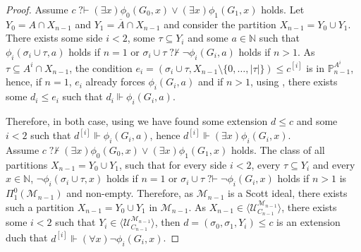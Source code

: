 \documentclass{article}
\def\NN{\mathbb{N}}
\def\PP{\mathbb{P}}
\def\DD{\mathbb{D}}
\def\U{\mathcal{U}}
\def\M{\mathcal{M}}
\def\PP{\mathbb{P}}
\newcommand{\qvdash}{\operatorname{{?}{\vdash}}}
\newcommand{\nqvdash}{\operatorname{{?}{\nvdash}}}
\numberwithin{theorem}{section}
\newtheorem{lemma}[theorem]{Lemma}
\theoremstyle{definition}
\begin{document}
\begin{proof}

Assume $c \qvdash (\exists x)\phi_0(G_0,x) \vee (\exists x)\phi_1(G_1,x)$ holds. Let $Y_0 = A \cap X_{n-1}$ and $Y_1 = \overline{A} \cap X_{n-1}$ and consider the partition $X_{n-1} = Y_0 \cup Y_1$. There exists some side $i < 2$, some $\tau \subseteq Y_i$ and some $a \in \NN$ such that $\phi_i(\sigma_i \cup \tau,a)$ holds if $n = 1$ or $\sigma_i \cup \tau \nqvdash \neg \phi_{i}(G_i,a)$ holds if $n > 1$. As $\tau \subseteq A^i \cap X_{n-1}$, the condition $e_i = (\sigma_i \cup \tau, X_{n-1} \setminus \{0, \dots, |\tau|\}) \leq c^{[i]}$ is in $\PP_{n-1}^{A^i}$, hence, if $n = 1$, $e_i$ already forces $\phi_i(G_i,a)$ and if $n > 1$, using , there exists some $d_i \leq e_i$ such that $d_i \Vdash \phi_{i}(G_i,a)$.

Therefore, in both case, using  we have found some extension $d \leq c$ and some $i < 2$ such that $d^{[i]} \Vdash \phi_{i}(G_i,a)$, hence $d^{[i]} \Vdash (\exists x)\phi_i(G_i,x)$. \\

Assume $c \nqvdash (\exists x)\phi_0(G_0,x) \vee (\exists x)\phi_1(G_1,x)$ holds. The class of all partitions $X_{n-1} = Y_0 \cup Y_1$, such that for every side $i < 2$, every $\tau \subseteq Y_i$ and every $x \in \NN$, $\neg \phi_i(\sigma_i \cup \tau, x)$ holds if $n = 1$ or $\sigma_i \cup \tau \qvdash \neg \phi_{i}(G_i,x)$ holds if $n > 1$ is $\Pi_1^0(\M_{n-1})$ and non-empty. Therefore, as $\M_{n-1}$ is a Scott ideal, there exists such a partition $X_{n-1} = Y_0 \cup Y_1$ in $\M_{n-1}$. As $X_{n-1} \in \langle \U_{C_{n-1}}^{\M_{n-1}} \rangle$, there exists some $i < 2$ such that $Y_i \in \langle \U_{C_{n-1}}^{\M_{n-1}} \rangle$, then $d = (\sigma_0, \sigma_1, Y_i) \leq c$ is an extension duch that $d^{[i]} \Vdash (\forall x) \neg \phi_i(G_i,x)$.
\end{proof}
\end{document}
